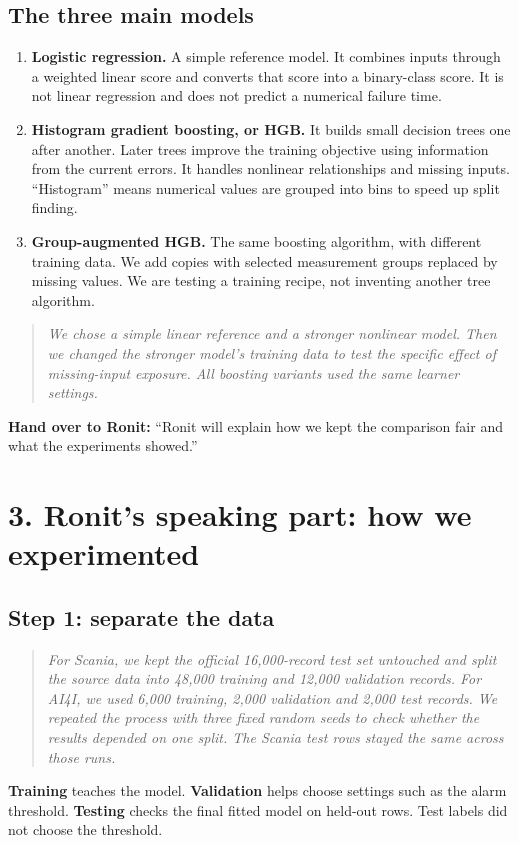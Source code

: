 \documentclass[11pt,a4paper]{article}
\newcommand{\say}[1]{\begin{quote}\itshape #1\end{quote}}
\begin{document}
\subsection*{The three main models}
\begin{enumerate}
\item \textbf{Logistic regression.} A simple reference model. It combines inputs through a weighted linear score and converts that score into a binary-class score. It is not linear regression and does not predict a numerical failure time.
\item \textbf{Histogram gradient boosting, or HGB.} It builds small decision trees one after another. Later trees improve the training objective using information from the current errors. It handles nonlinear relationships and missing inputs. ``Histogram'' means numerical values are grouped into bins to speed up split finding.
\item \textbf{Group-augmented HGB.} The same boosting algorithm, with different training data. We add copies with selected measurement groups replaced by missing values. We are testing a training recipe, not inventing another tree algorithm.
\end{enumerate}

\say{We chose a simple linear reference and a stronger nonlinear model. Then we changed the stronger model's training data to test the specific effect of missing-input exposure. All boosting variants used the same learner settings.}

\textbf{Hand over to Ronit:} ``Ronit will explain how we kept the comparison fair and what the experiments showed.''

\newpage
\section*{3. Ronit's speaking part: how we experimented}
\subsection*{Step 1: separate the data}
\say{For Scania, we kept the official 16,000-record test set untouched and split the source data into 48,000 training and 12,000 validation records. For AI4I, we used 6,000 training, 2,000 validation and 2,000 test records. We repeated the process with three fixed random seeds to check whether the results depended on one split. The Scania test rows stayed the same across those runs.}

\textbf{Training} teaches the model. \textbf{Validation} helps choose settings such as the alarm threshold. \textbf{Testing} checks the final fitted model on held-out rows. Test labels did not choose the threshold.
\end{document}
